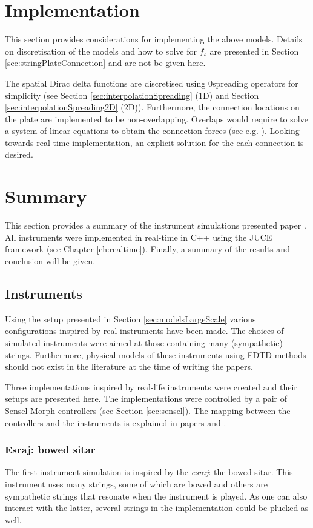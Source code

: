 \section{Implementation}
This section provides considerations for implementing the above models. Details on discretisation of the models and how to solve for $f_s$ are presented in Section \ref{sec:stringPlateConnection} and are not be given here. 

The spatial Dirac delta functions are discretised using 0\thOrder spreading operators for simplicity (see Section \ref{sec:interpolationSpreading} (1D) and Section \ref{sec:interpolationSpreading2D} (2D)). Furthermore, the connection locations on the plate are implemented to be non-overlapping. Overlaps would require to solve a system of linear equations to obtain the connection forces (see e.g. \cite{Bilbao2009Modular}). Looking towards real-time implementation, an explicit solution for the each connection is desired.

\section{Summary}
This section provides a summary of the instrument simulations presented paper \citeP[A]. All instruments were implemented in real-time in C++ using the JUCE framework (see Chapter \ref{ch:realtime}). Finally, a summary of the results and conclusion will be given.

\subsection{Instruments}\label{sec:largeScaleInstruments}
Using the setup presented in Section \ref{sec:modelsLargeScale} various configurations inspired by real instruments have been made. The choices of simulated instruments were aimed at those containing many (sympathetic) strings. Furthermore, physical models of these instruments using FDTD methods should not exist in the literature at the time of writing the papers.

Three implementations inspired by real-life instruments were created and their setups are presented here. The implementations were controlled by a pair of Sensel Morph controllers (see Section \ref{sec:sensel}). The mapping between the controllers and the instruments is explained in papers \citeP[A] and \citeP[B].

\subsubsection{Esraj: bowed sitar}
The first instrument simulation is inspired by the \textit{esraj}: the bowed sitar. This instrument uses many strings, some of which are bowed and others are sympathetic strings that resonate when the instrument is played. As one can also interact with the latter, several strings in the implementation could be plucked as well. 

